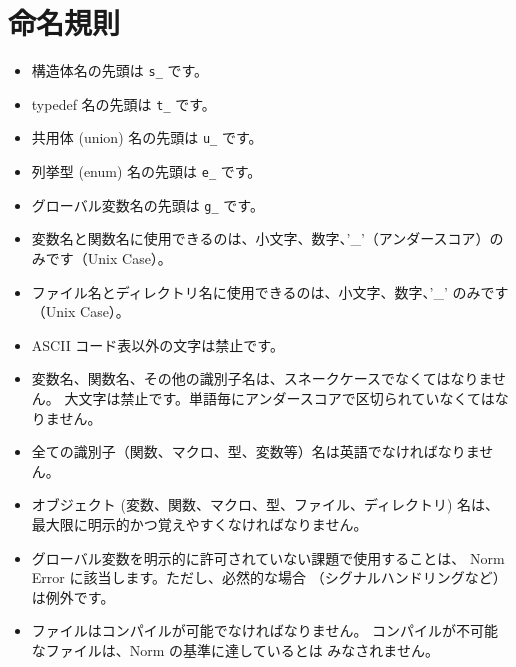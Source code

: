 \documentclass{42-ja}
\begin{document}
    \section{命名規則}

        \begin{itemize}

            \item 構造体名の先頭は
                \texttt{s\_} です。

            \item typedef 名の先頭は
                \texttt{t\_} です。

			\item 共用体 (union) 名の先頭は \texttt{u\_} です。

			\item 列挙型 (enum) 名の先頭は \texttt{e\_} です。

            \item グローバル変数名の先頭は \texttt{g\_} です。

            \item 変数名と関数名に使用できるのは、小文字、数字、'\_'（アンダースコア）のみです（Unix Case）。

            \item ファイル名とディレクトリ名に使用できるのは、小文字、数字、'\_' のみです（Unix Case）。

            \item ASCII コード表以外の文字は禁止です。

            \item 変数名、関数名、その他の識別子名は、スネークケースでなくてはなりません。
				大文字は禁止です。単語毎にアンダースコアで区切られていなくてはなりません。

            \item 全ての識別子（関数、マクロ、型、変数等）名は英語でなければなりません。

			\item オブジェクト (変数、関数、マクロ、型、ファイル、ディレクトリ)
				名は、最大限に明示的かつ覚えやすくなければなりません。

            \item グローバル変数を明示的に許可されていない課題で使用することは、
				Norm Error に該当します。ただし、必然的な場合
				（シグナルハンドリングなど）は例外です。

            \item ファイルはコンパイルが可能でなければなりません。
				コンパイルが不可能なファイルは、Norm の基準に達しているとは
				みなされません。
        \end{itemize}
\newpage
\end{document}
